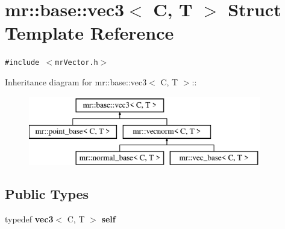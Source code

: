 \section{mr::base::vec3$<$ C, T $>$ Struct Template Reference}
\label{structmr_1_1base_1_1vec3}
{\tt \#include $<$mr\-Vector.h$>$}

Inheritance diagram for mr::base::vec3$<$ C, T $>$::\begin{figure}[H]
\begin{center}
\leavevmode
\includegraphics[height=3cm]{structmr_1_1base_1_1vec3}
\end{center}
\end{figure}
\subsection*{Public Types}
\begin{CompactItemize}
\item 
typedef {\bf vec3}$<$ C, T $>$ {\bf self}
\end{CompactItemize}

